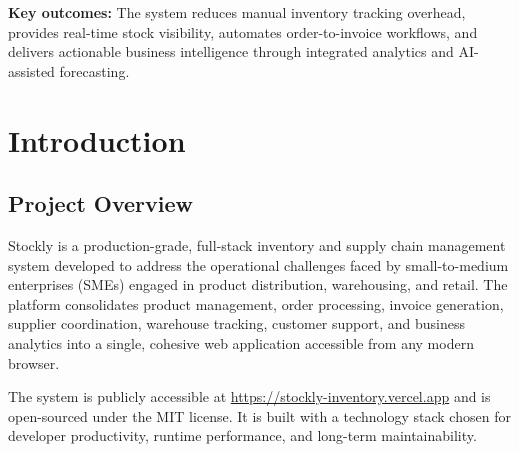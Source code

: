 \documentclass[12pt,onecolumn]{IEEEtran}
\let\oldsection\section
\renewcommand{\section}{\clearpage\oldsection}
\begin{document}
\textbf{Key outcomes:} The system reduces manual inventory tracking overhead, provides real-time stock visibility, automates order-to-invoice workflows, and delivers actionable business intelligence through integrated analytics and AI-assisted forecasting.

\newpage

\tableofcontents
\newpage


\section{Introduction}

\subsection{Project Overview}

Stockly is a production-grade, full-stack inventory and supply chain management system developed to address the operational challenges faced by small-to-medium enterprises (SMEs) engaged in product distribution, warehousing, and retail. The platform consolidates product management, order processing, invoice generation, supplier coordination, warehouse tracking, customer support, and business analytics into a single, cohesive web application accessible from any modern browser.

The system is publicly accessible at \url{https://stockly-inventory.vercel.app} and is open-sourced under the MIT license. It is built with a technology stack chosen for developer productivity, runtime performance, and long-term maintainability.
\end{document}
